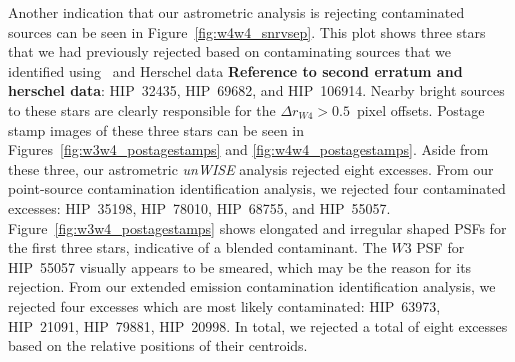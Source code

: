     Another indication that our astrometric analysis is rejecting contaminated sources can be seen in Figure~\ref{fig:w4w4_snrvsep}. This plot shows three stars that we had previously rejected based on contaminating sources that we identified using \WS\ and Herschel data \textbf{Reference to second erratum and herschel data}: HIP~32435, HIP~69682, and HIP~106914. Nearby bright sources to these stars are clearly responsible for the $\Delta r_{W4} > 0.5$~pixel offsets. Postage stamp images of these three stars can be seen in Figures~\ref{fig:w3w4_postagestamps} and \ref{fig:w4w4_postagestamps}. Aside from these three, our astrometric \textit{unWISE} analysis rejected eight excesses. From our point-source contamination identification analysis, we rejected four contaminated excesses: HIP~35198, HIP~78010, HIP~68755, and HIP~55057. Figure~\ref{fig:w3w4_postagestamps} shows elongated and irregular shaped PSFs for the first three stars, indicative of a blended contaminant. The $W3$ PSF for HIP~55057 visually appears to be smeared, which may be the reason for its rejection. %
    From our extended emission contamination identification analysis, we rejected four excesses which are most likely contaminated: HIP~63973, HIP~21091, HIP~79881, HIP~20998. In total, we rejected a total of eight excesses based on the relative positions of their centroids. 
    
    
